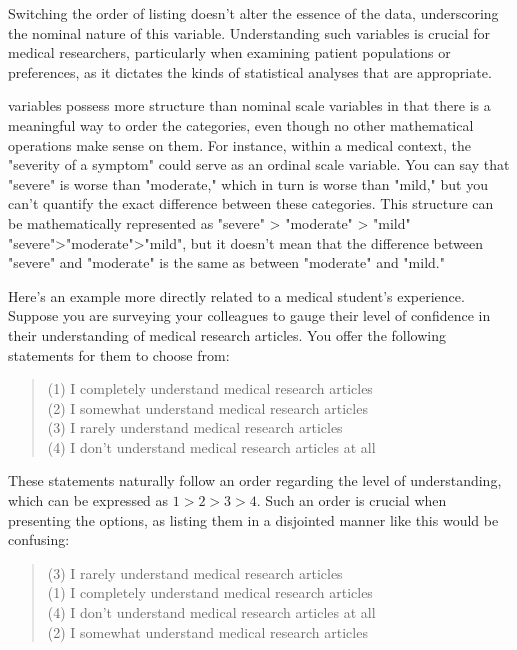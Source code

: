 \noindent
Switching the order of listing doesn't alter the essence of the data, underscoring the nominal nature of this variable. Understanding such variables is crucial for medical researchers, particularly when examining patient populations or preferences, as it dictates the kinds of statistical analyses that are appropriate.


 variables possess more structure than nominal scale variables in that there is a meaningful way to order the categories, even though no other mathematical operations make sense on them. For instance, within a medical context, the "severity of a symptom" could serve as an ordinal scale variable. You can say that "severe" is worse than "moderate," which in turn is worse than "mild," but you can't quantify the exact difference between these categories. This structure can be mathematically represented as 
"severe"
>
"moderate"
>
"mild"
"severe">"moderate">"mild", but it doesn't mean that the difference between "severe" and "moderate" is the same as between "moderate" and "mild."

Here's an example more directly related to a medical student's experience. Suppose you are surveying your colleagues to gauge their level of confidence in their understanding of medical research articles. You offer the following statements for them to choose from:

\begin{quote}
(1) I completely understand medical research articles \\
(2) I somewhat understand medical research articles \\
(3) I rarely understand medical research articles \\
(4) I don't understand medical research articles at all
\end{quote}

These statements naturally follow an order regarding the level of understanding, which can be expressed as $1 > 2 > 3 > 4$. Such an order is crucial when presenting the options, as listing them in a disjointed manner like this would be confusing:

\begin{quote}
(3) I rarely understand medical research articles \\
(1) I completely understand medical research articles \\
(4) I don't understand medical research articles at all \\
(2) I somewhat understand medical research articles
\end{quote}


